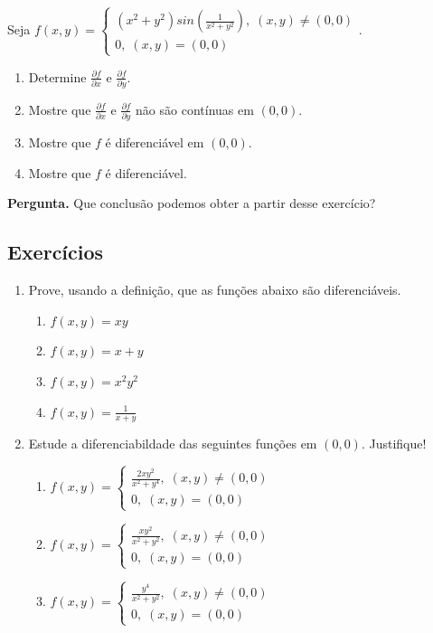 \begin{exercise}
    Seja \(f(x,y) = \begin{cases}
        (x^2 + y^2)sin\left( \frac{1}{x^2 + y^2} \right),\; (x,y)\neq(0,0) \\
        0,\; (x,y)=(0,0)
    \end{cases}.\)
        \begin{enumerate}
            \item Determine \(\frac{\partial f}{\partial x}\) e \(\frac{\partial f}{\partial y}\).
            \item Mostre que \(\frac{\partial f}{\partial x}\) e \(\frac{\partial f}{\partial y}\) não são contínuas em \((0,0)\).
            \item Mostre que \(f\) é diferenciável em \((0,0)\).
            \item Mostre que \(f\) é diferenciável.
        \end{enumerate}

    \textbf{Pergunta. } Que conclusão podemos obter a partir desse exercício?
\end{exercise}

\subsection{Exercícios}

\begin{enumerate}
    \item Prove, usando a definição, que as funções abaixo são diferenciáveis.
        \begin{enumerate}
            \item \(f(x,y) = xy\)
            \item \(f(x,y) = x + y\)
            \item \( f(x,y) = x^2 y^2 \)
            \item \(f(x,y) = \frac{1}{x+y}\)
        \end{enumerate}
    \item Estude a diferenciabildade das seguintes funções em \((0,0)\). Justifique!
        \begin{enumerate}
            \item \(f(x,y) = \begin{cases}
                \frac{2xy^2}{x^2 + y^4},\; (x,y)\neq(0,0) \\
                0,\; (x,y)=(0,0)
            \end{cases}\)
            \item \(f(x,y) = \begin{cases}
                \frac{xy^2}{x^2+y^2},\; (x,y)\neq(0,0) \\
                0,\; (x,y)=(0,0)
            \end{cases}\)
            \item \(f(x,y) = \begin{cases}
                \frac{y^4}{x^2+y^2},\; (x,y)\neq(0,0) \\
                0,\; (x,y)=(0,0)
            \end{cases}\)
        \end{enumerate}
\end{enumerate}


